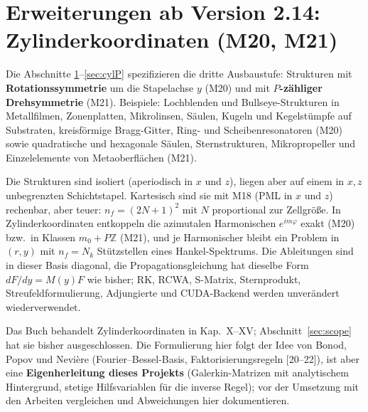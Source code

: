 \clearpage
\section{Erweiterungen ab Version 2.14: Zylinderkoordinaten (M20, M21)}\label{sec:cylext}
\providecommand{\hk}[1]{\langle\!\langle #1\rangle\!\rangle}
Die Abschnitte \ref{sec:cylext}--\ref{sec:cylP} spezifizieren die dritte Ausbaustufe: Strukturen mit
\textbf{Rotationssymmetrie} um die Stapelachse $y$ (M20) und mit \textbf{$P$-zähliger Drehsymmetrie} (M21).
Beispiele: Lochblenden und Bullseye-Strukturen in Metallfilmen, Zonenplatten, Mikrolinsen, Säulen, Kugeln und
Kegelstümpfe auf Substraten, kreisförmige Bragg-Gitter, Ring- und Scheibenresonatoren (M20) sowie quadratische und
hexagonale Säulen, Sternstrukturen, Mikropropeller und Einzelelemente von Metaoberflächen (M21).

Die Strukturen sind isoliert (aperiodisch in $x$ und $z$), liegen aber auf einem in $x,z$ unbegrenzten
Schichtstapel. Kartesisch sind sie mit M18 (PML in $x$ und $z$) rechenbar, aber teuer: $n_f=(2N+1)^2$ mit $N$
proportional zur Zellgröße. In Zylinderkoordinaten entkoppeln die azimutalen Harmonischen $e^{im\varphi}$
exakt (M20) bzw.\ in Klassen $m_0+P\mathbb Z$ (M21), und je Harmonischer bleibt ein Problem in $(r,y)$ mit
$n_f=N_k$ Stützstellen eines Hankel-Spektrums. Die Ableitungen sind in dieser Basis diagonal, die
Propagationsgleichung hat dieselbe Form $dF/dy=M(y)F$ wie bisher; RK, RCWA, S-Matrix, Sternprodukt,
Streufeldformulierung, Adjungierte und CUDA-Backend werden unverändert wiederverwendet.

Das Buch behandelt Zylinderkoordinaten in Kap.~X--XV; Abschnitt~\ref{sec:scope} hat sie bisher ausgeschlossen. Die
Formulierung hier folgt der Idee von Bonod, Popov und Nevière (Fourier--Bessel-Basis, Faktorisierungsregeln
[20--22]), ist aber eine \textbf{Eigenherleitung dieses Projekts}
(Galerkin-Matrizen mit analytischem Hintergrund, stetige Hilfsvariablen für die inverse Regel); vor der Umsetzung
mit den Arbeiten vergleichen und Abweichungen hier dokumentieren.

